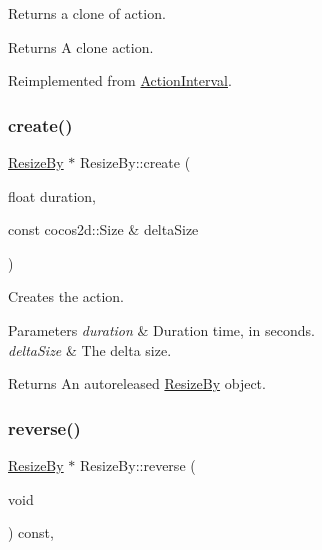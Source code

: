 Returns a clone of action.

\begin{DoxyReturn}{Returns}
A clone action. 
\end{DoxyReturn}


Reimplemented from \hyperlink{classActionInterval_abc93ce0c2f54a90eb216a7803f25f44a}{Action\+Interval}.

\mbox{\label{classResizeBy_adc08cae1c4c196456a484b2bb68346d8}} 
\subsubsection{\texorpdfstring{create()}{create()}}
{\footnotesize\ttfamily \hyperlink{classResizeBy}{Resize\+By} $\ast$ Resize\+By\+::create (\begin{DoxyParamCaption}\item[{float}]{duration,  }\item[{const cocos2d\+::\+Size \&}]{delta\+Size }\end{DoxyParamCaption})\hspace{0.3cm}{\ttfamily [static]}}

Creates the action.


\begin{DoxyParams}{Parameters}
{\em duration} & Duration time, in seconds. \\
\hline
{\em delta\+Size} & The delta size. \\
\hline
\end{DoxyParams}
\begin{DoxyReturn}{Returns}
An autoreleased \hyperlink{classResizeBy}{Resize\+By} object. 
\end{DoxyReturn}
\mbox{\label{classResizeBy_a8eb9541a2fd900fba35408ed5f432735}} 
\subsubsection{\texorpdfstring{reverse()}{reverse()}}
{\footnotesize\ttfamily \hyperlink{classResizeBy}{Resize\+By} $\ast$ Resize\+By\+::reverse (\begin{DoxyParamCaption}\item[{void}]{ }\end{DoxyParamCaption}) const\hspace{0.3cm}{\ttfamily [override]}, {\ttfamily [virtual]}}

